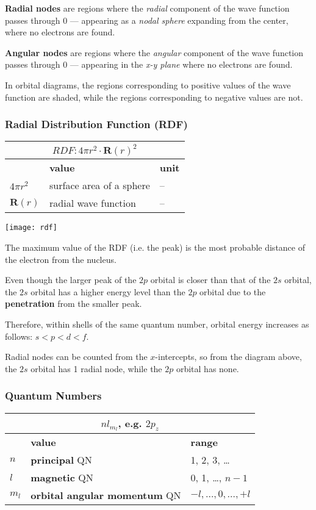 \textbf{Radial nodes} are regions where the \textit{radial} component of the wave function passes through 0
--- appearing as a \emph{nodal sphere} expanding from the center, where no electrons are found.

\textbf{Angular nodes} are regions where the \textit{angular} component of the wave function passes through 0
--- appearing in the \emph{x-y plane} where no electrons are found.

In orbital diagrams, the regions corresponding to positive values of the wave function are shaded,
while the regions corresponding to negative values are not.

\subsubsection{Radial Distribution Function (RDF)}
\begin{tabularx}{\linewidth}{|l|X|l|} \hline
    \multicolumn{3}{|c|}{$RDF: 4 \pi r^2 \cdot \mathbf{R}(r)^2$ } \\ \hline
    & \textbf{value} & \textbf{unit} \\ \hline
    $4 \pi r^2$ & surface area of a sphere & -- \\
    $\mathbf{R}(r)$ & radial wave function & -- \\ \hline
\end{tabularx}

\vspace*{1em}
\texttt{[image: rdf]}

The maximum value of the RDF (i.e. the peak) is the most probable distance of the electron
from the nucleus.

Even though the larger peak of the $2p$ orbital is closer than that of the $2s$ orbital,
the $2s$ orbital has a higher energy level than the $2p$ orbital due to the \textbf{penetration}
from the smaller peak.

Therefore, within shells of the same quantum number, orbital energy increases as follows:
 $s < p < d < f$.

 Radial nodes can be counted from the $x$-intercepts, so from the diagram above,
 the $2s$ orbital has 1 radial node, while the $2p$ orbital has none.

 \subsubsection{Quantum Numbers}
 \begin{tabularx}{\linewidth}{|l|X|X|} \hline
    \multicolumn{3}{|c|}{$nl_{m_l}$, e.g. $2p_z$} \\ \hline
    & \textbf{value} & \textbf{range} \\ \hline
    $n$ & \textbf{principal} QN & 1, 2, 3, \dots \\
    $l$ & \textbf{magnetic} QN & 0, 1, \dots, $n-1$ \\
    $m_l$ & \textbf{orbital angular momentum} QN & $-l, \dots, 0, \dots, +l$ \\ \hline
\end{tabularx}

